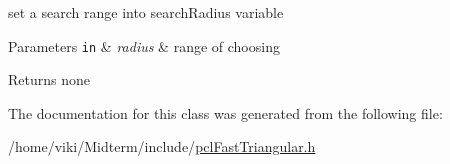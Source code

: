 set a search range into search\+Radius variable 


\begin{DoxyParams}[1]{Parameters}
\mbox{\tt in}  & {\em radius} & range of choosing \\
\hline
\end{DoxyParams}
\begin{DoxyReturn}{Returns}
none 
\end{DoxyReturn}


The documentation for this class was generated from the following file\+:\begin{DoxyCompactItemize}
\item 
/home/viki/\+Midterm/include/\hyperlink{pclFastTriangular_8h}{pcl\+Fast\+Triangular.\+h}\end{DoxyCompactItemize}
